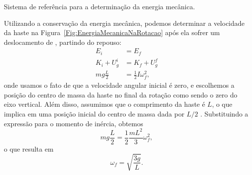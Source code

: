 \begin{marginfigure}
\centering
{}
\caption{Sistema de referência para a determinação da energia mecânica.}
\end{marginfigure}

Utilizando a conservação da energia mecânica, podemos determinar a velocidade da haste na Figura~\ref{Fig:EnergiaMecanicaNaRotacao} após ela sofrer um deslocamento de , partindo do repouso:
\begin{align}
    E_i &= E_f \\
    K_i + U_g^i &= K_f + U_g^f \\
    mg\frac{L}{2} &= \frac{1}{2} I \omega_f^2,
\end{align}
%
onde usamos o fato de que a velocidade angular inicial é zero, e escolhemos a posição do centro de massa da haste no final da rotação como sendo o zero do eixo vertical. Além disso, assumimos que o comprimento da haste é $L$, o que implica em uma posição inicial do centro de massa dada por $L/2$ . Substituindo a expressão para o momento de inércia, obtemos
\begin{equation}
    mg\frac{L}{2} = \frac{1}{2} \frac{mL^2}{3} \omega_f^2,
\end{equation}
%
o que resulta em
\begin{equation}
    \omega_f = \sqrt{\frac{3g}{L}}.
\end{equation}

